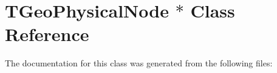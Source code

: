 \hypertarget{class_t_geo_physical_node_01_5}{}\section{T\+Geo\+Physical\+Node $\ast$ Class Reference}
\label{class_t_geo_physical_node_01_5}


The documentation for this class was generated from the following files\+: